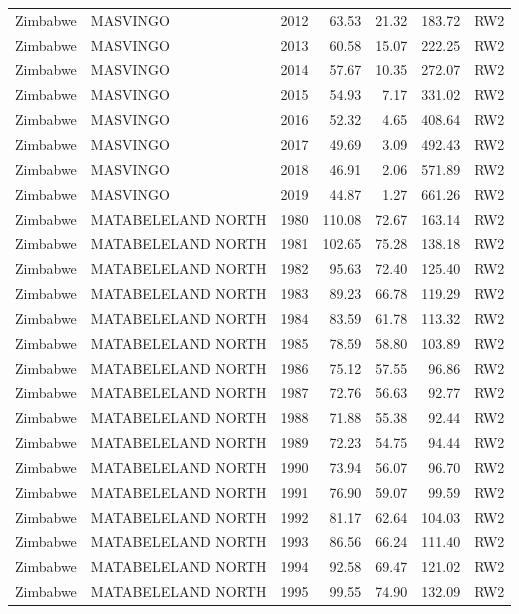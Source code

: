 \begin{longtable}{lllrrrl}
  Zimbabwe & MASVINGO & 2012 & 63.53 & 21.32 & 183.72 & RW2 \\ 
  Zimbabwe & MASVINGO & 2013 & 60.58 & 15.07 & 222.25 & RW2 \\ 
  Zimbabwe & MASVINGO & 2014 & 57.67 & 10.35 & 272.07 & RW2 \\ 
  Zimbabwe & MASVINGO & 2015 & 54.93 & 7.17 & 331.02 & RW2 \\ 
  Zimbabwe & MASVINGO & 2016 & 52.32 & 4.65 & 408.64 & RW2 \\ 
  Zimbabwe & MASVINGO & 2017 & 49.69 & 3.09 & 492.43 & RW2 \\ 
  Zimbabwe & MASVINGO & 2018 & 46.91 & 2.06 & 571.89 & RW2 \\ 
  Zimbabwe & MASVINGO & 2019 & 44.87 & 1.27 & 661.26 & RW2 \\ 
  Zimbabwe & MATABELELAND NORTH & 1980 & 110.08 & 72.67 & 163.14 & RW2 \\ 
  Zimbabwe & MATABELELAND NORTH & 1981 & 102.65 & 75.28 & 138.18 & RW2 \\ 
  Zimbabwe & MATABELELAND NORTH & 1982 & 95.63 & 72.40 & 125.40 & RW2 \\ 
  Zimbabwe & MATABELELAND NORTH & 1983 & 89.23 & 66.78 & 119.29 & RW2 \\ 
  Zimbabwe & MATABELELAND NORTH & 1984 & 83.59 & 61.78 & 113.32 & RW2 \\ 
  Zimbabwe & MATABELELAND NORTH & 1985 & 78.59 & 58.80 & 103.89 & RW2 \\ 
  Zimbabwe & MATABELELAND NORTH & 1986 & 75.12 & 57.55 & 96.86 & RW2 \\ 
  Zimbabwe & MATABELELAND NORTH & 1987 & 72.76 & 56.63 & 92.77 & RW2 \\ 
  Zimbabwe & MATABELELAND NORTH & 1988 & 71.88 & 55.38 & 92.44 & RW2 \\ 
  Zimbabwe & MATABELELAND NORTH & 1989 & 72.23 & 54.75 & 94.44 & RW2 \\ 
  Zimbabwe & MATABELELAND NORTH & 1990 & 73.94 & 56.07 & 96.70 & RW2 \\ 
  Zimbabwe & MATABELELAND NORTH & 1991 & 76.90 & 59.07 & 99.59 & RW2 \\ 
  Zimbabwe & MATABELELAND NORTH & 1992 & 81.17 & 62.64 & 104.03 & RW2 \\ 
  Zimbabwe & MATABELELAND NORTH & 1993 & 86.56 & 66.24 & 111.40 & RW2 \\ 
  Zimbabwe & MATABELELAND NORTH & 1994 & 92.58 & 69.47 & 121.02 & RW2 \\ 
  Zimbabwe & MATABELELAND NORTH & 1995 & 99.55 & 74.90 & 132.09 & RW2 \\ 

\end{longtable}
